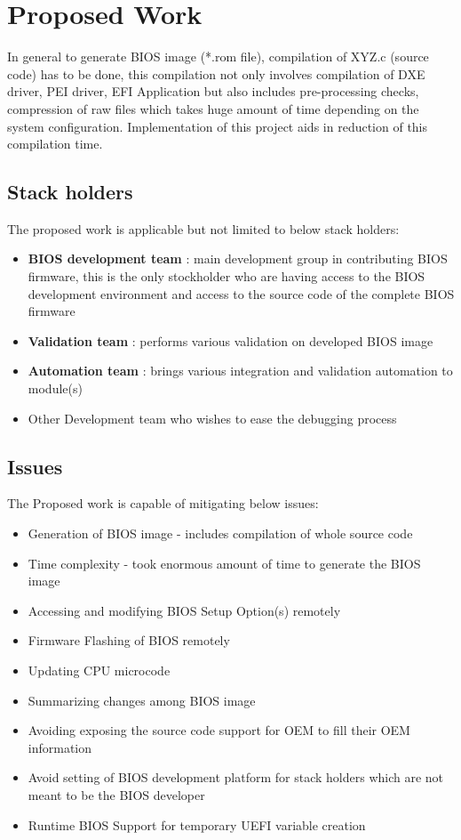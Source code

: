 \section{Proposed Work}\label{section-proposed-work}
In general to generate BIOS image (*.rom file), compilation of XYZ.c (source code) has to be done, this compilation not only involves compilation of DXE driver, PEI driver, EFI Application but also includes pre-processing checks, compression of raw files which takes huge amount of time depending on the system configuration. Implementation of this project aids in reduction of this compilation time.

\subsection{Stack holders}\label{subsection-stack-holders}
The proposed work is applicable but not limited to below stack holders:
\begin{itemize}
	\item \textbf{BIOS development team} : main development group in contributing BIOS firmware, this is the only stockholder who are having access to the BIOS development environment and access to the source code of the complete BIOS firmware
	\item \textbf{Validation team} : performs various validation on developed BIOS image
	\item \textbf{Automation team} : brings various integration and validation automation to module(s)
	\item Other Development team who wishes to ease the debugging process
\end{itemize}

\subsection{Issues}\label{subsection-issues}
The Proposed work is capable of mitigating below issues:
\begin{itemize}
	\item Generation of BIOS image - includes compilation of whole source code
	\item Time complexity - took enormous amount of time to generate the BIOS image
	\item Accessing and modifying BIOS Setup Option(s) remotely
	\item Firmware Flashing of BIOS remotely
	\item Updating CPU microcode
	\item Summarizing changes among BIOS image
	\item Avoiding exposing the source code support for OEM to fill their OEM information
	\item Avoid setting of BIOS development platform for stack holders which are not meant to be the BIOS developer
	\item Runtime BIOS Support for temporary UEFI variable creation
\end{itemize}

